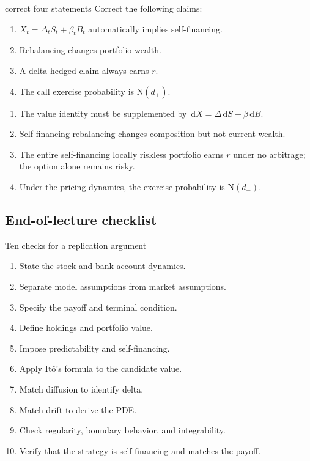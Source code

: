 \documentclass[10pt]{article}
\newcommand{\1}{\mathbf 1}
\newcommand{\dd}{\,\mathrm d}
\newcommand{\Ito}{\mathrm{It\hat{o}}}
\newcommand{\Ncdf}{\mathrm N}
\theoremstyle{definition}
\begin{document}
\begin{studentexercise}{correct four statements}
Correct the following claims:
\begin{enumerate}
  \item \(X_t=\Delta_tS_t+\beta_tB_t\) automatically implies
        self-financing.
  \item Rebalancing changes portfolio wealth.
  \item A delta-hedged claim always earns \(r\).
  \item The call exercise probability is \(\Ncdf(d_+)\).
\end{enumerate}
\end{studentexercise}
\begin{shortsolution}
\begin{enumerate}
  \item The value identity must be supplemented by
        \(\dd X=\Delta\dd S+\beta\dd B\).
  \item Self-financing rebalancing changes composition but not current wealth.
  \item The entire self-financing locally riskless portfolio earns \(r\)
        under no arbitrage; the option alone remains risky.
  \item Under the pricing dynamics, the exercise probability is
        \(\Ncdf(d_-)\).
\end{enumerate}
\end{shortsolution}

\subsection{End-of-lecture checklist}

\begin{keyidea}{Ten checks for a replication argument}
\begin{enumerate}
  \item State the stock and bank-account dynamics.
  \item Separate model assumptions from market assumptions.
  \item Specify the payoff and terminal condition.
  \item Define holdings and portfolio value.
  \item Impose predictability and self-financing.
  \item Apply \(\Ito\)'s formula to the candidate value.
  \item Match diffusion to identify delta.
  \item Match drift to derive the PDE.
  \item Check regularity, boundary behavior, and integrability.
  \item Verify that the strategy is self-financing and matches the payoff.
\end{enumerate}
\end{keyidea}
\end{document}
